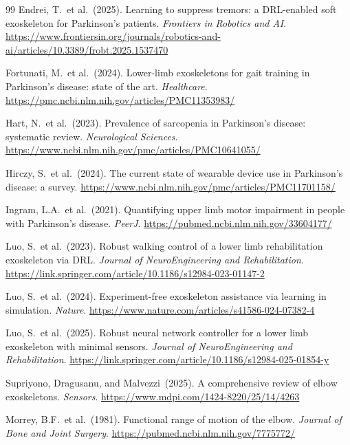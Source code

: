 \documentclass{article}
\begin{document}
\begin{thebibliography}{99}
Endrei, T.\ et al.\ (2025).
Learning to suppress tremors: a DRL-enabled soft exoskeleton for
Parkinson's patients.
\textit{Frontiers in Robotics and AI}.
\url{https://www.frontiersin.org/journals/robotics-and-ai/articles/10.3389/frobt.2025.1537470}

Fortunati, M.\ et al.\ (2024).
Lower-limb exoskeletons for gait training in Parkinson's disease:
state of the art.
\textit{Healthcare}.
\url{https://pmc.ncbi.nlm.nih.gov/articles/PMC11353983/}

Hart, N.\ et al.\ (2023).
Prevalence of sarcopenia in Parkinson's disease: systematic review.
\textit{Neurological Sciences}.
\url{https://www.ncbi.nlm.nih.gov/pmc/articles/PMC10641055/}

Hirczy, S.\ et al.\ (2024).
The current state of wearable device use in Parkinson's disease: a survey.
\url{https://www.ncbi.nlm.nih.gov/pmc/articles/PMC11701158/}

Ingram, L.A.\ et al.\ (2021).
Quantifying upper limb motor impairment in people with Parkinson's disease.
\textit{PeerJ}.
\url{https://pubmed.ncbi.nlm.nih.gov/33604177/}

Luo, S.\ et al.\ (2023).
Robust walking control of a lower limb rehabilitation exoskeleton via DRL.
\textit{Journal of NeuroEngineering and Rehabilitation}.
\url{https://link.springer.com/article/10.1186/s12984-023-01147-2}

Luo, S.\ et al.\ (2024).
Experiment-free exoskeleton assistance via learning in simulation.
\textit{Nature}.
\url{https://www.nature.com/articles/s41586-024-07382-4}

Luo, S.\ et al.\ (2025).
Robust neural network controller for a lower limb exoskeleton with
minimal sensors.
\textit{Journal of NeuroEngineering and Rehabilitation}.
\url{https://link.springer.com/article/10.1186/s12984-025-01854-y}

Supriyono, Dragusanu, and Malvezzi\ (2025).
A comprehensive review of elbow exoskeletons.
\textit{Sensors}.
\url{https://www.mdpi.com/1424-8220/25/14/4263}

Morrey, B.F.\ et al.\ (1981).
Functional range of motion of the elbow.
\textit{Journal of Bone and Joint Surgery}.
\url{https://pubmed.ncbi.nlm.nih.gov/7775772/}


\end{thebibliography}
\end{document}
